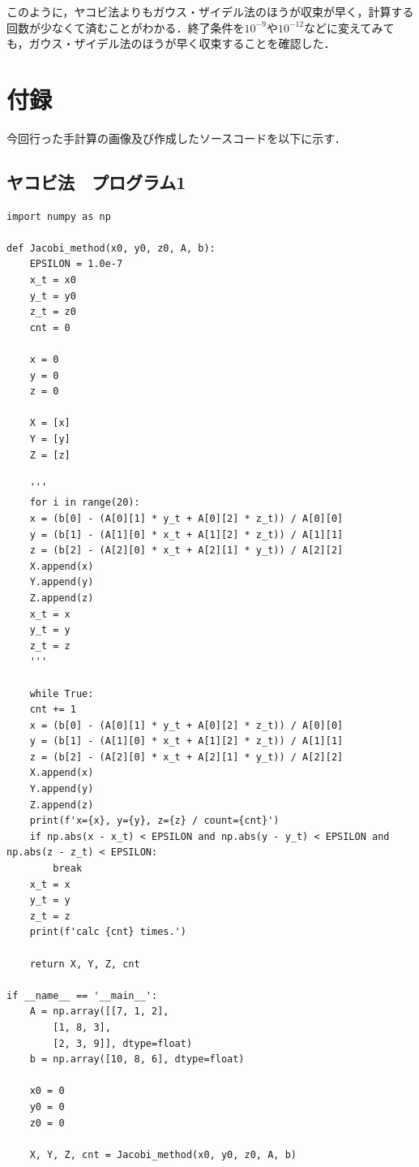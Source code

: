 \documentclass[a4paper, titlepage]{jsarticle}
\begin{document}
	このように，ヤコビ法よりもガウス・ザイデル法のほうが収束が早く，計算する回数が少なくて済むことがわかる．終了条件を$10^{-9}$や$10^{-12}$などに変えてみても，ガウス・ザイデル法のほうが早く収束することを確認した．

	\section{付録}
	今回行った手計算の画像及び作成したソースコードを以下に示す．

		\subsection{ヤコビ法　プログラム1}
			\begin{lstlisting}
import numpy as np

def Jacobi_method(x0, y0, z0, A, b):
    EPSILON = 1.0e-7
    x_t = x0
    y_t = y0
    z_t = z0
    cnt = 0
    
    x = 0
    y = 0
    z = 0
    
    X = [x]
    Y = [y]
    Z = [z]

    '''
    for i in range(20):
	x = (b[0] - (A[0][1] * y_t + A[0][2] * z_t)) / A[0][0]
	y = (b[1] - (A[1][0] * x_t + A[1][2] * z_t)) / A[1][1]
	z = (b[2] - (A[2][0] * x_t + A[2][1] * y_t)) / A[2][2]
	X.append(x)
	Y.append(y)
	Z.append(z)
	x_t = x
	y_t = y
	z_t = z
    '''

    while True:
	cnt += 1
	x = (b[0] - (A[0][1] * y_t + A[0][2] * z_t)) / A[0][0]
	y = (b[1] - (A[1][0] * x_t + A[1][2] * z_t)) / A[1][1]
	z = (b[2] - (A[2][0] * x_t + A[2][1] * y_t)) / A[2][2]
	X.append(x)
	Y.append(y)
	Z.append(z)
	print(f'x={x}, y={y}, z={z} / count={cnt}')
	if np.abs(x - x_t) < EPSILON and np.abs(y - y_t) < EPSILON and np.abs(z - z_t) < EPSILON:
	    break
	x_t = x
	y_t = y
	z_t = z
    print(f'calc {cnt} times.')

    return X, Y, Z, cnt

if __name__ == '__main__':
    A = np.array([[7, 1, 2],
		[1, 8, 3],
		[2, 3, 9]], dtype=float)
    b = np.array([10, 8, 6], dtype=float)

    x0 = 0
    y0 = 0
    z0 = 0

    X, Y, Z, cnt = Jacobi_method(x0, y0, z0, A, b)
			\end{lstlisting}
\end{document}
